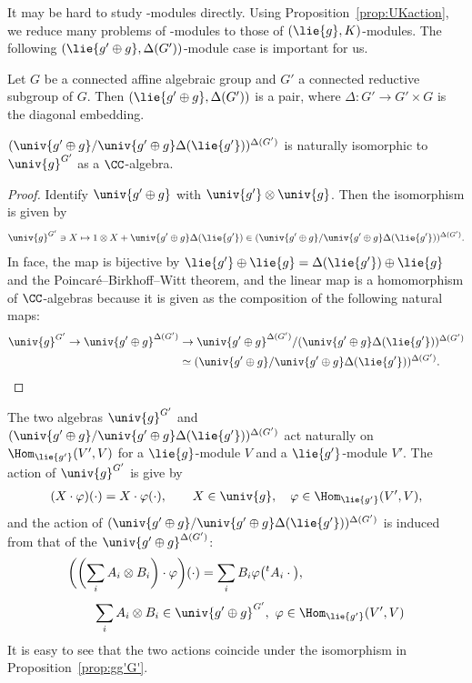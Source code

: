 It may be hard to study -modules directly.
Using Proposition~\ref{prop:UKaction}, we reduce many problems of -modules
to those of $(\lie{g}, K)$-modules.
The following $(\lie{g'\oplus g}, \Delta(G'))$-module case is important for us.

Let $G$ be a connected affine algebraic group and $G'$ a connected reductive subgroup of $G$.
Then $(\lie{g' \oplus g}, \Delta(G'))$ is a pair, where $\Delta\colon G'\rightarrow G'\times G$ is the diagonal embedding.

\begin{Proposition}\label{prop:gg'G'}
	$(\univ{g'\oplus g}/\univ{g'\oplus g}\Delta(\lie{g'}))^{\Delta(G')}$
	is naturally isomorphic to $\univ{g}^{G'}$ as a $\CC$-algebra.
\end{Proposition}

\begin{proof}
	Identify $\univ{g'\oplus g}$ with $\univ{g'}\otimes \univ{g}$.
	Then the isomorphism is given by
	\begin{align*}
		\univ{g}^{G'} \ni X \mapsto 1\otimes X + \univ{g'\oplus g}\Delta(\lie{g'}) \in (\univ{g'\oplus g}/\univ{g'\oplus g}\Delta(\lie{g'}))^{\Delta(G')}.
	\end{align*}
	In face, the map is bijective by $\lie{g'}\oplus \lie{g} = \Delta(\lie{g'}) \oplus \lie{g}$ and the Poincar\'e--Birkhoff--Witt theorem,
	and the linear map is a homomorphism of $\CC$-algebras because it is given as the composition of the following natural maps:
	\begin{align*}
		\univ{g}^{G'} \rightarrow \univ{g'\oplus g}^{\Delta(G')} &\rightarrow \univ{g'\oplus g}^{\Delta(G')}/(\univ{g'\oplus g}\Delta(\lie{g'}))^{\Delta(G')} \\
		&\simeq (\univ{g'\oplus g}/\univ{g'\oplus g}\Delta(\lie{g'}))^{\Delta(G')}. \qedhere
 \tag*{\qed}
 \end{align*}
\renewcommand{\qed}{}
\end{proof}

The two algebras $\univ{g}^{G'}$ and $(\univ{g'\oplus g}/\univ{g'\oplus g}\Delta(\lie{g'}))^{\Delta(G')}$ act naturally on $\Hom_{\lie{g'}}(V', V)$ for a $\lie{g}$-module $V$ and a $\lie{g'}$-module $V'$.
The action of $\univ{g}^{G'}$ is give by
\begin{align*}
	(X\cdot \varphi)(\cdot) = X\cdot \varphi(\cdot), \qquad X \in \univ{g},\quad \varphi \in \Hom_{\lie{g'}}(V', V),
\end{align*}
and the action of $(\univ{g'\oplus g}/\univ{g'\oplus g}\Delta(\lie{g'}))^{\Delta(G')}$ is induced from that of the $\univ{g'\oplus g}^{\Delta(G')}$:
\begin{align*}
	&\biggl(\biggl(\sum_{i} A_i \otimes B_i\biggr) \cdot \varphi\biggr)(\cdot)= \sum_i B_i \varphi\big({}^tA_i \cdot\big), \\
	&\qquad \sum_i A_i \otimes B_i \in \univ{g'\oplus g}^{G'},\ \varphi \in \Hom_{\lie{g'}}(V', V)\biggr.
\end{align*}
It is easy to see that the two actions coincide under the isomorphism in Proposition~\ref{prop:gg'G'}.

